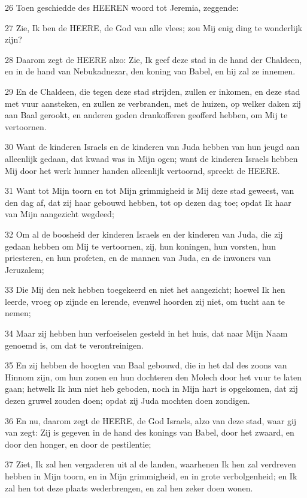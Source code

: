 \par 26 Toen geschiedde des HEEREN woord tot Jeremia, zeggende:
\par 27 Zie, Ik ben de HEERE, de God van alle vlees; zou Mij enig ding te wonderlijk zijn?
\par 28 Daarom zegt de HEERE alzo: Zie, Ik geef deze stad in de hand der Chaldeen, en in de hand van Nebukadnezar, den koning van Babel, en hij zal ze innemen.
\par 29 En de Chaldeen, die tegen deze stad strijden, zullen er inkomen, en deze stad met vuur aansteken, en zullen ze verbranden, met de huizen, op welker daken zij aan Baal gerookt, en anderen goden drankofferen geofferd hebben, om Mij te vertoornen.
\par 30 Want de kinderen Israels en de kinderen van Juda hebben van hun jeugd aan alleenlijk gedaan, dat kwaad was in Mijn ogen; want de kinderen Israels hebben Mij door het werk hunner handen alleenlijk vertoornd, spreekt de HEERE.
\par 31 Want tot Mijn toorn en tot Mijn grimmigheid is Mij deze stad geweest, van den dag af, dat zij haar gebouwd hebben, tot op dezen dag toe; opdat Ik haar van Mijn aangezicht wegdeed;
\par 32 Om al de boosheid der kinderen Israels en der kinderen van Juda, die zij gedaan hebben om Mij te vertoornen, zij, hun koningen, hun vorsten, hun priesteren, en hun profeten, en de mannen van Juda, en de inwoners van Jeruzalem;
\par 33 Die Mij den nek hebben toegekeerd en niet het aangezicht; hoewel Ik hen leerde, vroeg op zijnde en lerende, evenwel hoorden zij niet, om tucht aan te nemen;
\par 34 Maar zij hebben hun verfoeiselen gesteld in het huis, dat naar Mijn Naam genoemd is, om dat te verontreinigen.
\par 35 En zij hebben de hoogten van Baal gebouwd, die in het dal des zoons van Hinnom zijn, om hun zonen en hun dochteren den Molech door het vuur te laten gaan; hetwelk Ik hun niet heb geboden, noch in Mijn hart is opgekomen, dat zij dezen gruwel zouden doen; opdat zij Juda mochten doen zondigen.
\par 36 En nu, daarom zegt de HEERE, de God Israels, alzo van deze stad, waar gij van zegt: Zij is gegeven in de hand des konings van Babel, door het zwaard, en door den honger, en door de pestilentie;
\par 37 Ziet, Ik zal hen vergaderen uit al de landen, waarhenen Ik hen zal verdreven hebben in Mijn toorn, en in Mijn grimmigheid, en in grote verbolgenheid; en Ik zal hen tot deze plaats wederbrengen, en zal hen zeker doen wonen.

